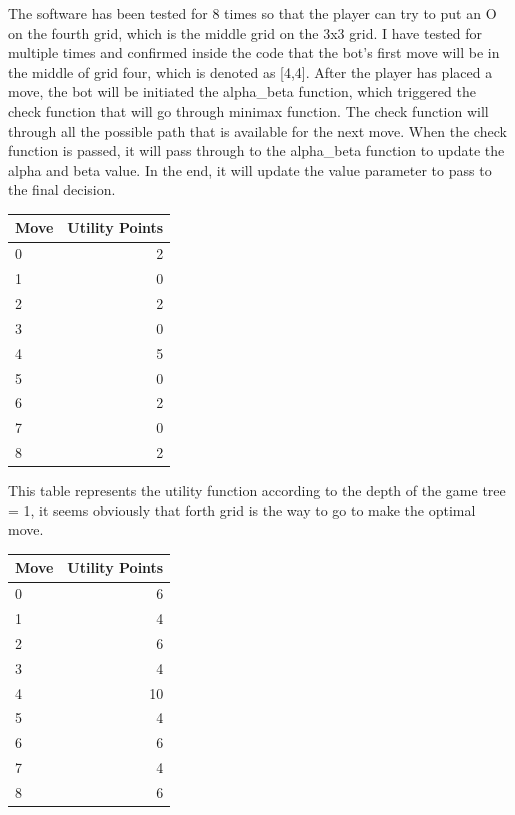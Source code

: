 \documentclass[12pt]{article}
\begin{document}
The software has been tested for 8 times so that the player can try to put an O on the fourth grid, which is the middle grid on the 3x3 grid. I have tested for multiple times and confirmed inside the code that the bot's first move will be in the middle of grid four, which is denoted as [4,4]. After the player has placed a move, the bot will be initiated the alpha\_beta function, which triggered the check function that will go through minimax function. The check function will through all the possible path that is available for the next move. When the check function is passed, it will pass through to the alpha\_beta function to update the alpha and beta value. In the end, it will update the value parameter to pass to the final decision.
\newline
\begin{center}
\begin{tabular}{|l|r|}
\hline
Move & Utility Points \\ \hline
0 & 2 \\ \hline
1 & 0\\ \hline
2 & 2 \\ \hline
3 & 0 \\ \hline
4 & 5 \\ \hline
5 & 0 \\ \hline
6 & 2\\ \hline 
7 & 0\\ \hline
8 & 2 \\ \hline
\end{tabular}
\end{center}

This table represents the utility function according to the depth of the game tree = 1, it seems obviously that forth grid is the way to go to make the optimal move.
\newline
\begin{center}
\begin{tabular}{|l|r|}
\hline
Move & Utility Points \\ \hline
0 & 6 \\ \hline
1 & 4\\ \hline
2 & 6 \\ \hline
3 & 4 \\ \hline
4 & 10 \\ \hline
5 & 4 \\ \hline
6 & 6\\ \hline 
7 & 4\\ \hline
8 & 6 \\ \hline
\end{tabular}
\end{center}
\end{document}
